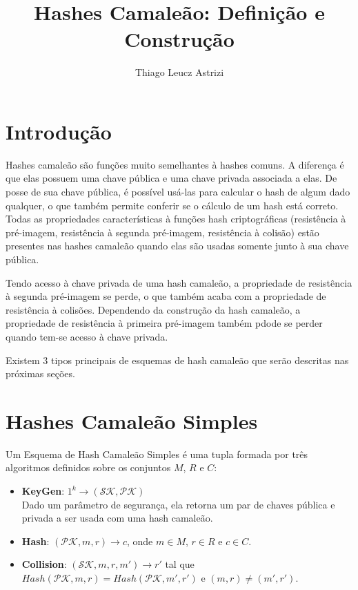 \documentclass[a4paper]{article}
\title{Hashes Camaleão: Definição e Construção}
\author{Thiago Leucz Astrizi}
\begin{document}
\maketitle

\section{Introdução}

Hashes camaleão são funções muito semelhantes à hashes comuns. A
diferença é que elas possuem uma chave pública e uma chave privada
associada a elas. De posse de sua chave pública, é possível usá-las
para calcular o hash de algum dado qualquer, o que também permite
conferir se o cálculo de um hash está correto. Todas as propriedades
características à funções hash criptográficas (resistência à
pré-imagem, resistência à segunda pré-imagem, resistência à colisão)
estão presentes nas hashes camaleão quando elas são usadas somente
junto à sua chave pública.

Tendo acesso à chave privada de uma hash camaleão, a propriedade de
resistência à segunda pré-imagem se perde, o que também acaba com a
propriedade de resistência à colisões. Dependendo da construção da
hash camaleão, a propriedade de resistência à primeira pré-imagem
também pdode se perder quando tem-se acesso à chave privada.

Existem 3 tipos principais de esquemas de hash camaleão que serão
descritas nas próximas seções.

\section{Hashes Camaleão Simples}

Um Esquema de Hash Camaleão Simples é uma tupla formada por três
algoritmos definidos sobre os conjuntos $M$, $R$ e $C$:

\begin{itemize}
\item\textbf{KeyGen}: $1^k \rightarrow (\mathcal{SK}, \mathcal{PK})$\\
  Dado um parâmetro de segurança, ela retorna um par de chaves pública
  e privada a ser usada com uma hash camaleão.
\item\textbf{Hash}: $(\mathcal{PK}, m, r) \rightarrow c$, onde $m \in
  M$, $r \in R$ e $c \in C$.
\item\textbf{Collision}: $(\mathcal{SK}, m, r, m') \rightarrow r'$
  tal que $Hash(\mathcal{PK}, m, r) = Hash(\mathcal{PK}, m', r')$ e
  $(m, r) \neq (m', r')$.
\end{itemize}
\end{document}
